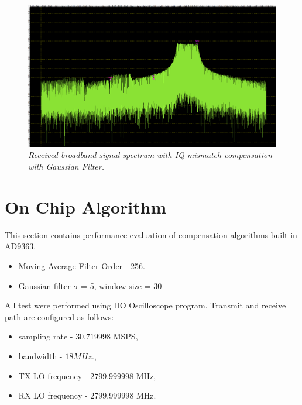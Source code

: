 \documentclass[en,printmode]{mgr}
\begin{document}
   		\begin{figure}[!htb]
    		\centering
   			\includegraphics[width=\textwidth]{plots/my_band_gauss.png}
   		 	\caption{\textit{Received broadband signal spectrum with IQ mismatch compensation with
   		 	Gaussian Filter.}}
   		\end{figure}
	\newpage
	\section{On Chip Algorithm}
		This section contains performance evaluation of compensation algorithms built in AD9363.
		\begin{itemize}
			\item Moving Average Filter Order - 256.
			\item Gaussian filter $\sigma$ = 5, window size = 30
		\end{itemize}
	    \vspace{1cm}	
		All test were performed using IIO Oscilloscope program.
		Transmit and receive path are configured as follows:
		\begin{itemize}
			\item sampling rate - $30.719998$ MSPS,
			\item bandwidth - $18MHz$.,
			\item TX LO frequency - $2799.999998$ MHz,
			\item RX LO frequency - $2799.999998$ MHz.
		\end{itemize}

	    \vspace{1cm}
\end{document}
